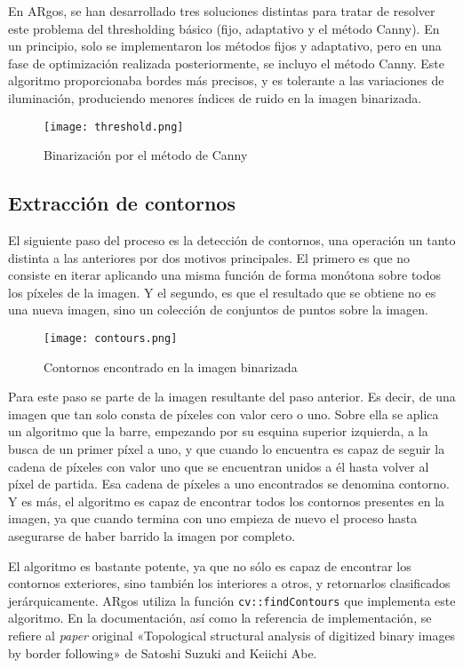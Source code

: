 En ARgos, se han desarrollado tres soluciones distintas para tratar de resolver este problema del
thresholding básico (fijo, adaptativo y el método Canny). En un principio, solo se implementaron
los métodos fijos y adaptativo, pero en una fase de optimización realizada posteriormente, se incluyo
el método Canny. Este algoritmo proporcionaba bordes más precisos, y es  tolerante a las
variaciones de iluminación, produciendo menores índices de ruido en la imagen binarizada.

\begin{figure}[h] 
  \centering
  \texttt{[image: threshold.png]}
  \caption{Binarización por el método de Canny}
  \label{fig:binarizacion}
\end{figure}

\subsection{Extracción de contornos}
El siguiente paso del proceso es la detección de contornos, una operación un tanto distinta a las
anteriores por dos motivos principales. El primero es que no consiste en iterar aplicando una misma
función de forma monótona sobre todos los píxeles de la imagen. Y el segundo, es que el resultado que
se obtiene no es una nueva imagen, sino un colección de conjuntos de puntos sobre la imagen.

\begin{figure}[h] 
  \centering
  \texttt{[image: contours.png]}
  \caption{Contornos encontrado en la imagen binarizada}
  \label{fig:contours}
\end{figure}

Para este paso se parte de la imagen resultante del paso anterior. Es decir, de una imagen que tan
solo consta de píxeles con valor cero o uno. Sobre ella se aplica un algoritmo que la barre,
empezando por su esquina superior izquierda, a la busca de un primer píxel a uno, y que cuando lo
encuentra es capaz de seguir la cadena de píxeles con valor uno que se encuentran unidos a él hasta
volver al píxel de partida. Esa cadena de píxeles a uno encontrados se denomina contorno. Y es más,
el algoritmo es capaz de encontrar todos los contornos presentes en la imagen, ya que cuando termina
con uno empieza de nuevo el proceso hasta asegurarse de haber barrido la imagen por completo.

El algoritmo es bastante potente, ya que no sólo es capaz de encontrar los contornos exteriores,
sino también los interiores a otros, y retornarlos clasificados jerárquicamente. ARgos utiliza la
función \texttt{cv::findContours} que implementa este algoritmo. En la documentación, así como la
referencia de implementación, se refiere al \textit{paper} original «Topological structural analysis
of digitized binary images by border following» de Satoshi Suzuki and Keiichi Abe.

